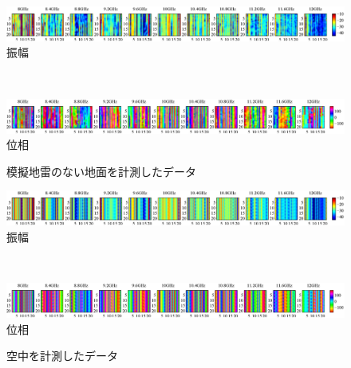﻿\documentclass[12pt,oneside]{jsbook}
\begin{document}
\begin{figure}[hbtp]
 \begin{center}
     \begin{minipage}[c]{\hsize}
\includegraphics[width = \hsize ]{20150204_none1_raw_a.eps}
\centering\textmd{振幅}
  \end{minipage}
\\
     \begin{minipage}[c]{\hsize}
\includegraphics[width =\hsize ]{20150204_none1_raw_p.eps}
\centering\textmd{位相}
  \end{minipage}
\caption{模擬地雷のない地面を計測したデータ}
\label{none-raw} 
 \end{center}
\end{figure}
\begin{figure}[hbtp]
 \begin{center}
     \begin{minipage}[c]{\hsize}
\includegraphics[width = \hsize ]{20150206_direct2_raw_a.eps}
\centering\textmd{振幅}
  \end{minipage}
\\
     \begin{minipage}[c]{\hsize}
\includegraphics[width =\hsize ]{20150206_direct2_raw_p.eps}
\centering\textmd{位相}
  \end{minipage}
\caption{空中を計測したデータ}
\label{direct-raw}
 \end{center}
\end{figure}
\end{document}
